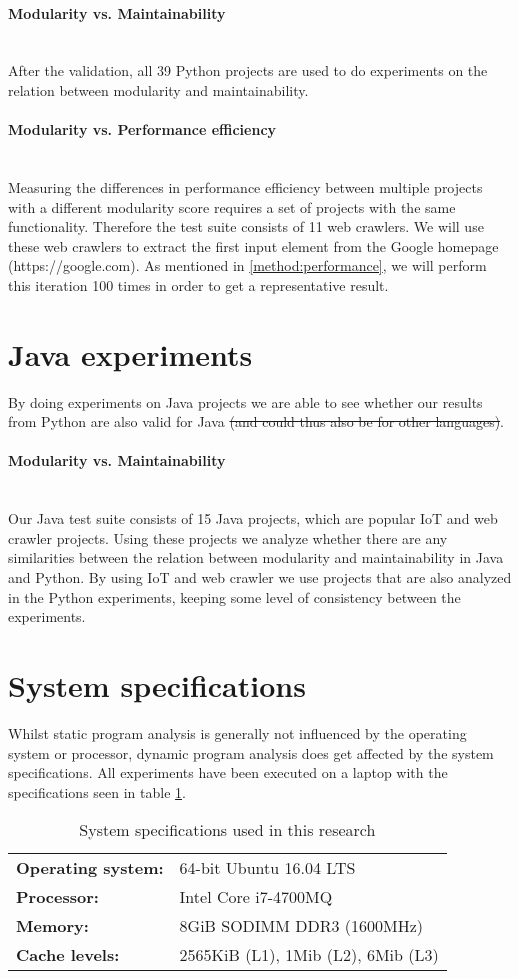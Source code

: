\documentclass[twoside]{uva-inf-bachelor-thesis}
\newcommand{\myparagraph}[1]{\paragraph{#1}\mbox{}\\}
\begin{document}
\myparagraph{Modularity vs. Maintainability}
After the validation, all 39 Python projects are used to do experiments on the relation between modularity and maintainability.

\myparagraph{Modularity vs. Performance efficiency}
Measuring the differences in performance efficiency between multiple projects with a different modularity score requires a set of projects with the same functionality. Therefore the test suite consists of 11 web crawlers. We will use these web crawlers to extract the first input element from the Google homepage (https://google.com). As mentioned in \autoref{method:performance}, we will perform this iteration 100 times in order to get a representative result.

\section{Java experiments}
By doing experiments on Java projects we are able to see whether our results from Python are also valid for Java \sout{(and could thus also be for other languages)}.

\myparagraph{Modularity vs. Maintainability}
Our Java test suite consists of 15 Java projects, which are popular IoT and web crawler projects. Using these projects we analyze whether there are any similarities between the relation between modularity and maintainability in Java and Python. By using IoT and web crawler we use projects that are also analyzed in the Python experiments, keeping some level of consistency between the experiments.

\section{System specifications}
Whilst static program analysis is generally not influenced by the operating system or processor, dynamic program analysis does get affected by the system specifications. All experiments have been executed on a laptop with the specifications seen in table \ref{table:specifications}.
\begin{table}[H]
\centering
\caption{System specifications used in this research}
\label{table:specifications}
\begin{tabular}{ll}
\textbf{Operating system:} & 64-bit Ubuntu 16.04 LTS    \\
\textbf{Processor:}        & Intel Core i7-4700MQ       \\
\textbf{Memory:}           & 8GiB SODIMM DDR3 (1600MHz) \\
\textbf{Cache levels:}     & 2565KiB (L1), 1Mib (L2), 6Mib (L3) \\
\end{tabular}
\end{table}
\end{document}
